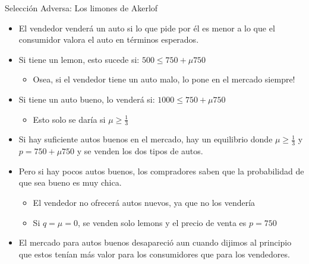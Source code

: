 \documentclass{beamer}
\begin{document}
\begin{frame}{Selección Adversa: Los limones de Akerlof}
    \begin{itemize}
    \item El vendedor venderá un auto si lo que pide por él es menor a lo que el consumidor valora el auto en términos esperados.
    \vspace{1mm}
    \item Si tiene un lemon, esto sucede si: $500\leq750+\mu750$
        \begin{itemize}
        \item Osea, si el vendedor tiene un auto malo, lo pone en el mercado siempre! 
        \end{itemize}
    \vspace{1mm}
    \item Si tiene un auto bueno, lo venderá si: 
    $1000 \leq 750 + \mu 750 $ 
        \begin{itemize}
        \item Esto solo se daría si $\mu \geq \frac{1}{3}$
        \end{itemize} 
    \item  Si hay suficiente autos buenos en el mercado, hay un equilibrio donde $\mu \geq \frac{1}{3}$ y $p= 750 + \mu 750$ y se venden los dos tipos de autos.     \vspace{1mm}
    \item Pero si hay pocos autos buenos, los compradores saben que la probabilidad de que sea bueno es muy chica.
    \begin{itemize}
    \item El vendedor no ofrecerá autos nuevos, ya que no los vendería
    \item Si $q= \mu = 0 $, se venden solo lemons y el precio de venta es $p= 750$ 
    \end{itemize}
    \item El mercado para autos buenos desapareció aun cuando dijimos al principio que estos tenían más valor para los consumidores que para los vendedores. 
    \end{itemize}   

    \hyperlink{volver}{}
    
\end{frame}
\end{document}
